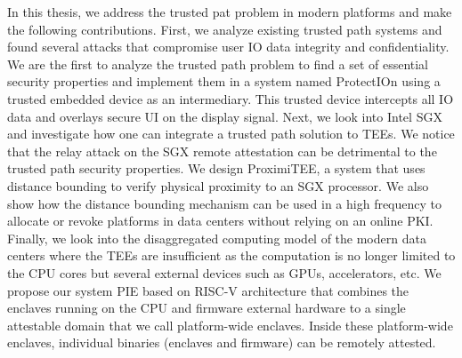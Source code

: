 In this thesis, we address the trusted pat problem in modern platforms and make the following contributions. First, we analyze existing trusted path systems and found several attacks that compromise user IO data integrity and confidentiality. We are the first to analyze the trusted path problem to find a set of essential security properties and implement them in a system named ProtectIOn using a trusted embedded device as an intermediary. This trusted device intercepts all IO data and overlays secure UI on the display signal. Next, we look into Intel SGX and investigate how one can integrate a trusted path solution to TEEs. We notice that the relay attack on the SGX remote attestation can be detrimental to the trusted path security properties. We design ProximiTEE, a system that uses distance bounding to verify physical proximity to an SGX processor. We also show how the distance bounding mechanism can be used in a high frequency to allocate or revoke platforms in data centers without relying on an online PKI. Finally, we look into the disaggregated computing model of the modern data centers where the TEEs are insufficient as the computation is no longer limited to the CPU cores but several external devices such as GPUs, accelerators, etc. We propose our system PIE based on RISC-V architecture that combines the enclaves running on the CPU and firmware external hardware to a single attestable domain that we call platform-wide enclaves. Inside these platform-wide enclaves, individual binaries (enclaves and firmware) can be remotely attested.
  

\endgroup
